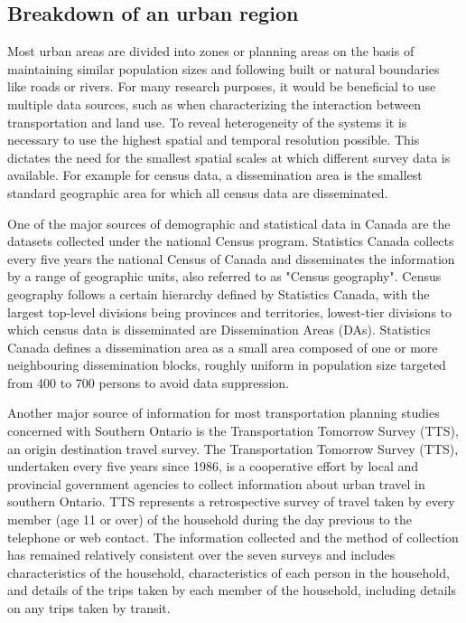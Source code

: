 \subsection{Breakdown of an urban region} \label{subsec:breakdown_of_urban_region}

Most urban areas are divided into zones or planning areas on the basis of maintaining similar population sizes and following built or natural boundaries like roads or rivers.
For many research purposes, it would be beneficial to use multiple data sources, such as when characterizing the interaction between transportation and land use.
To reveal heterogeneity of the systems it is necessary to use the highest spatial and temporal resolution possible.
This dictates the need for the smallest spatial scales at which different survey data is available.
For example for census data, a dissemination area is the smallest standard geographic area for which all census data are disseminated.

One of the major sources of demographic and statistical data in Canada are the datasets collected under the national Census program.
Statistics Canada collects every five years the national Census of Canada and disseminates the information by a range of geographic units, also referred to as "Census geography"\cite{MapandDataLibrary2019}.
Census geography follows a certain hierarchy defined by Statistics Canada, with the largest top-level divisions being provinces and territories, lowest-tier divisions to which census data is disseminated are Dissemination Areas (DAs)\cite{StatisticsCanada2018}.
Statistics Canada defines a dissemination area as a small area composed of one or more neighbouring dissemination blocks, roughly uniform in population size targeted from 400 to 700 persons to avoid data suppression\cite{StatisticsCanada2015}.

Another major source of information for most transportation planning studies concerned with Southern Ontario is the Transportation Tomorrow Survey (TTS)\cite{DataManagementGroup2014}, an origin destination travel survey.
The Transportation Tomorrow Survey (TTS), undertaken every five years since 1986, is a cooperative effort by local and provincial government agencies to collect information about urban travel in southern Ontario.
TTS represents a retrospective survey of travel taken by every member (age 11 or over) of the household during the day previous to the telephone or web contact.
The information collected and the method of collection has remained relatively consistent over the seven surveys and includes characteristics of the household, characteristics of each person in the household, and details of the trips taken by each member of the household, including details on any trips taken by transit\cite{Ashby2018}.

